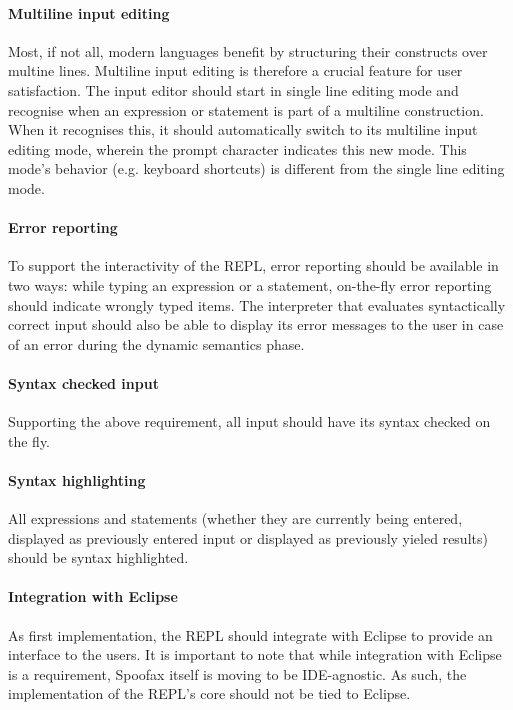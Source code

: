 \paragraph{Multiline input editing} Most, if not all, modern languages benefit
by structuring their constructs over multine lines. Multiline input editing is
therefore a crucial feature for user satisfaction. The input editor should
start in single line editing mode and recognise when an expression or statement
is part of a multiline construction. When it recognises this, it should
automatically switch to its multiline input editing mode, wherein the
prompt character indicates this new mode. This mode's behavior (e.g. keyboard
shortcuts) is different from the single line editing mode.

\paragraph{Error reporting} To support the interactivity of the REPL, error
reporting should be available in two ways: while typing an expression or a
statement, on-the-fly error reporting should indicate wrongly typed items. The
interpreter that evaluates syntactically correct input should also be able to
display its error messages to the user in case of an error during the dynamic
semantics phase.

\paragraph{Syntax checked input} Supporting the above requirement, all
input should have its syntax checked on the fly.

\paragraph{Syntax highlighting} All expressions and statements (whether they are
currently being entered, displayed as previously entered input or displayed as
previously yieled results) should be syntax highlighted.

\paragraph{Integration with Eclipse} As first implementation, the REPL should
integrate with Eclipse to provide an interface to the users. It is important to
note that while integration with Eclipse is a requirement, Spoofax itself is
moving to be IDE-agnostic. As such, the implementation of the REPL's core
should not be tied to Eclipse.

